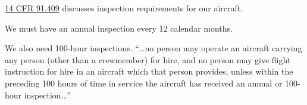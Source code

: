 \href{https://www.ecfr.gov/current/title-14/chapter-I/subchapter-F/part-91/subpart-E/section-91.409}{14 CFR 91.409} discusses inspection requirements for our aircraft.

We must have an annual inspection every 12 calendar months.

We also need 100-hour inspections. ``...no person may operate an aircraft carrying any person (other than a crewmember) for hire, and no person may give flight instruction for hire in an aircraft which that person provides, unless within the preceding 100 hours of time in service the aircraft has received an annual or 100-hour inspection...''








